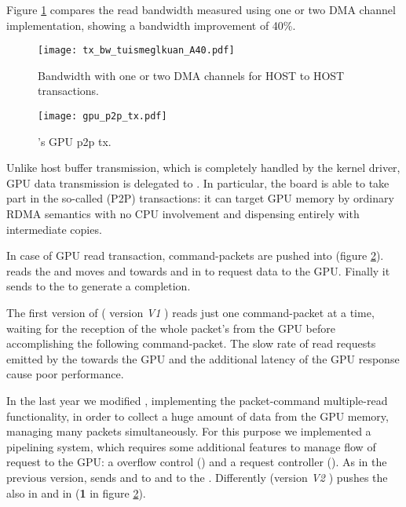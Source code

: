 Figure \ref{fig:2DMA_BW} compares the read bandwidth measured using
one or two DMA channel implementation, showing a bandwidth improvement
of 40\%.

 \begin{figure}[!hbt]
  \centering
  \texttt{[image: tx\_bw\_tuismeglkuan\_A40.pdf]}
  \caption{Bandwidth with one or two DMA channels for HOST to HOST
  transactions.}
  \label{fig:2DMA_BW}
\end{figure}



 \begin{figure}[!htb]
  \centering
  \texttt{[image: gpu\_p2p\_tx.pdf]}
  \caption{\apenetp's GPU p2p tx.}
  \label{fig:tx_gpu}
  
\end{figure}
Unlike host buffer transmission, which is completely handled by the
kernel driver, GPU data transmission is delegated to \apenetp.  In
particular, the \apenetp board is able to take part in the so-called
\PCIe \PtoP (P2P) transactions: it can target GPU memory by ordinary
RDMA semantics with no CPU involvement and dispensing entirely with
intermediate copies.

In case of GPU read transaction, command-packets are pushed into
 (figure \ref{fig:tx_gpu}). \ptoptx reads the
 and moves \header and \footer towards  and  in  to request data to the
GPU. Finally it sends  to the  to
generate a completion.


The first version of \ptoptx ( version \textit{V1} ) reads just one command-packet at a
time, waiting for the reception of the whole packet's \payload from
the GPU before accomplishing the following command-packet.
The slow rate of read requests emitted by the \ptoptx towards the
GPU and the additional latency of the GPU response cause poor
performance.


In the last year we modified \ptoptx, implementing the packet-command
multiple-read functionality, in order to collect a huge amount of data
from the GPU memory, managing many \apenetp packets simultaneously.
For this purpose we implemented a pipelining system, which requires
some additional features to manage flow of request to the GPU:
a  overflow control
() and a request controller ().
As in the previous version,  sends \header and
\footer to  and  to the .
Differently \ptoptx (version \textit{V2} ) pushes the \header also in 
and  in  (\textbf{1} in figure
\ref{fig:tx_gpu}).

